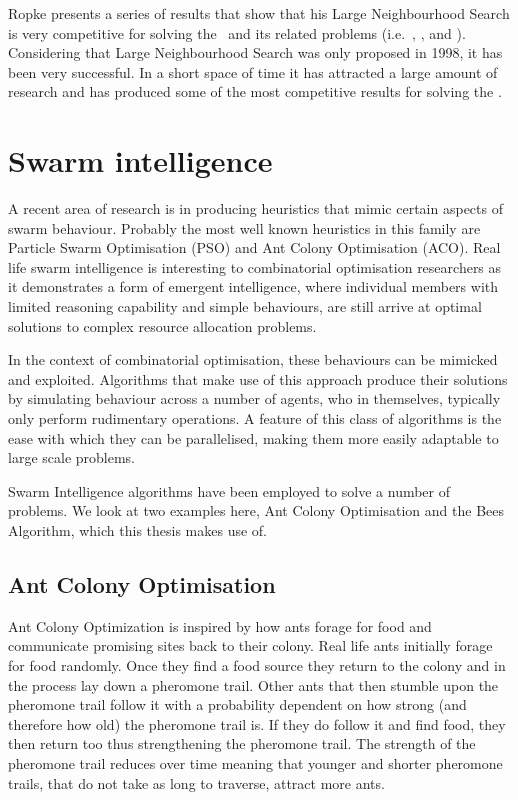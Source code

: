 Ropke presents a series of results that show that his Large Neighbourhood Search is very competitive for solving the \VRP\ and its related problems (i.e.~\VRPTW, \PDPTW, and \DARP). Considering that Large Neighbourhood Search was only proposed in 1998, it has been very successful. In a short space of time it has attracted a large amount of research and has produced some of the most competitive results for solving the \VRP.

\section{Swarm intelligence}
\label{sec:si}

A recent area of research is in producing heuristics that mimic certain aspects of swarm behaviour. Probably the most well known heuristics in this family are Particle Swarm Optimisation (PSO) and Ant Colony Optimisation (ACO). Real life swarm intelligence is interesting to combinatorial optimisation researchers as it demonstrates a form of emergent intelligence, where individual members with limited reasoning capability and simple behaviours, are still arrive at optimal solutions to complex resource allocation problems.

In the context of combinatorial optimisation, these behaviours can be mimicked and exploited. Algorithms that make use of this approach produce their solutions by simulating behaviour across a number of agents, who in themselves, typically only perform rudimentary operations. A feature of this class of algorithms is the ease with which they can be parallelised, making them more easily adaptable to large scale problems.

Swarm Intelligence algorithms have been employed to solve a number of problems. We look at two examples here, Ant Colony Optimisation and the Bees Algorithm, which this thesis makes use of.

\subsection{Ant Colony Optimisation}

Ant Colony Optimization is inspired by how ants forage for food and communicate promising sites back to their colony. Real life ants initially forage for food randomly. Once they find a food source they return to the colony and in the process lay down a pheromone trail. Other ants that then stumble upon the pheromone trail follow it with a probability dependent on how strong (and therefore how old) the pheromone trail is. If they do follow it and find food, they then return too thus strengthening the pheromone trail. The strength of the pheromone trail reduces over time meaning that younger and shorter pheromone trails, that do not take as long to traverse, attract more ants.  

